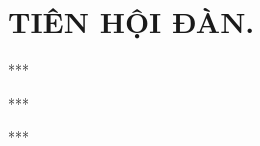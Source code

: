 \chapter{\uppercase{Tiên hội đàn.}}



\begin{center}
  ***
\end{center}



\begin{center}
  ***
\end{center}



\begin{center}
  ***
\end{center}
